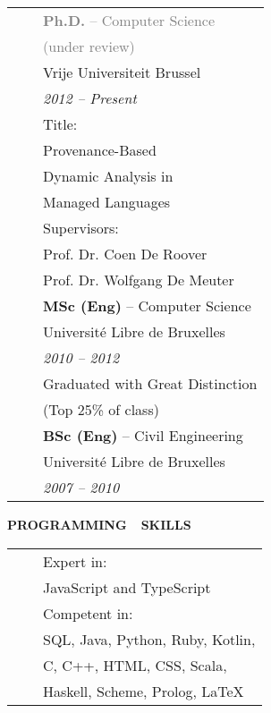 \documentclass[a4paper,11pt,english]{article}
\newcommand{\LeftColumn}[0]{6.0cm}
\newcommand{\ItemSkip}[0]{4pt}
\newcommand{\SubItemSkip}[0]{0pt}
\newcommand{\SubSubItemSkip}[0]{0pt}
\newcommand{\Bullet}[0]{\faCaretRight~~}
\newcommand{\Rubric}[1]{\colorbox{gray!20}{\parbox{\linewidth}{\centering\sffamily\bfseries{}#1}}}
\begin{document}
\begin{minipage}[t]{\LeftColumn}
\begin{tabular}{@{}l@{}l@{}}
\textcolor{gray}{\Bullet} & \textcolor{gray}{\textbf{Ph.D.} -- Computer Science} \\[\SubSubItemSkip]
& \quad \textcolor{gray}{(under review)} \\[\SubItemSkip]
& Vrije Universiteit Brussel \\[\SubItemSkip]
& \emph{2012 -- Present} \\[\SubItemSkip]
& Title:\\[\SubSubItemSkip]
& \quad Provenance-Based \\[\SubSubItemSkip]
& \quad Dynamic Analysis in \\[\SubSubItemSkip]
& \quad Managed Languages \\[\SubItemSkip]
& Supervisors: \\[\SubSubItemSkip]
& \quad Prof. Dr. Coen De Roover\\[\SubSubItemSkip]
& \quad Prof. Dr. Wolfgang De Meuter\\[\ItemSkip]
\Bullet & \textbf{MSc (Eng)} -- Computer Science \\[\SubItemSkip]
& Université Libre de Bruxelles \\[\SubItemSkip]
& \emph{2010 -- 2012} \\[\SubItemSkip]
& Graduated with Great Distinction \\[\SubSubItemSkip]
& \quad (Top 25\% of class) \\[\ItemSkip]
\Bullet & \textbf{BSc (Eng)} -- Civil Engineering \\[\SubItemSkip]
& Université Libre de Bruxelles \\[\SubItemSkip]
& \emph{2007 -- 2010} \\[0pt]
\end{tabular}

\vspace{12pt}\Rubric{\faCode \quad PROGRAMMING~~SKILLS}\vspace{8pt}

\begin{tabularx}{\linewidth}{@{}l@{}l@{}}
\Bullet & Expert in: \\[0pt]
& \quad JavaScript and TypeScript \\[\ItemSkip]
\Bullet & Competent in: \\[0pt]
& \quad SQL, Java, Python, Ruby, Kotlin, \\[0pt]
& \quad C, C++, HTML, CSS, Scala, \\[0pt]
& \quad Haskell, Scheme, Prolog, LaTeX \\[0pt]
\end{tabularx}

\end{minipage}
\end{document}
